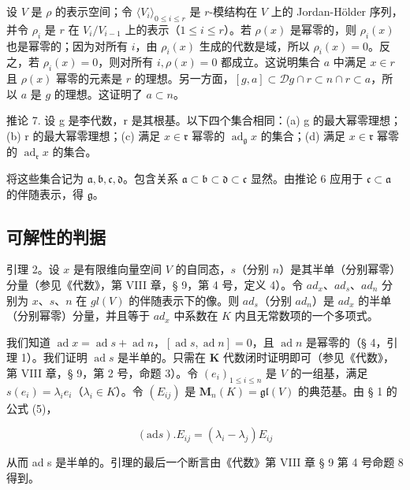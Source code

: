 设 \(V\) 是 \(\rho\) 的表示空间；令 \(\langle V_i \rangle_{0 \leqslant i \leqslant r}\) 是 \(r\)-模结构在 \(V\) 上的 Jordan-Hölder 序列，并令 \(\rho_i\) 是 \(r\) 在 \(V_i / V_{i-1}\) 上的表示（\(1 \leqslant i \leqslant r\)）。若 \(\rho(x)\) 是幂零的，则 \(\rho_i(x)\) 也是幂零的；因为对所有 \(i\)，由 \(\rho_i(x)\) 生成的代数是域，所以 \(\rho_i(x) = 0\)。反之，若 \(\rho_i(x) = 0\)，则对所有 \(i, \rho(x) = 0\) 都成立。这说明集合 \(a\) 中满足 \(x \in r\) 且 \(\rho(x)\) 幂零的元素是 \(r\) 的理想。另一方面，\([g, a] \subset \mathcal{D}g \cap r \subset n \cap r \subset a\)，所以 \(a\) 是 \(g\) 的理想。这证明了 \(a \subset n\)。

推论 7. 设 g 是李代数，r 是其根基。以下四个集合相同：(a) g 的最大幂零理想；(b) r 的最大幂零理想；(c) 满足 \(x \in \mathfrak{r}\) 幂零的 \(\operatorname{ad}_{\mathfrak{g}} x\) 的集合；(d) 满足 \(x \in \mathfrak{r}\) 幂零的 \(\operatorname{ad}_{\mathfrak{r}} x\) 的集合。

将这些集合记为 \(\mathfrak{a}, \mathfrak{b}, \mathfrak{c}, \mathfrak{d}\)。包含关系 \(\mathfrak{a} \subset \mathfrak{b} \subset \mathfrak{d} \subset \mathfrak{c}\) 显然。由推论 6 应用于 \(\mathfrak{c} \subset \mathfrak{a}\) 的伴随表示，得 \(\mathfrak{g}\)。

\subsection{可解性的判据}

引理 2。设 \(x\) 是有限维向量空间 \(V\) 的自同态，\(s\)（分别 \(n\)）是其半单（分别幂零）分量（参见《代数》，第 VIII 章，§ 9，第 4 号，定义 4）。令 \(ad_x\)、\(ad_s\)、\(ad_n\) 分别为 \(x\)、\(s\)、\(n\) 在 \(gl(V)\) 的伴随表示下的像。则 \(ad_s\)（分别 \(ad_n\)）是 \(ad_x\) 的半单（分别幂零）分量，并且等于 \(ad_x\) 中系数在 \(K\) 内且无常数项的一个多项式。

我们知道 \(\operatorname{ad} x = \operatorname{ad} s + \operatorname{ad} n\)，\([\operatorname{ad} s, \operatorname{ad} n] = 0\)，且 \(\operatorname{ad} n\) 是幂零的（§ 4，引理 1）。我们证明 \(\operatorname{ad} s\) 是半单的。只需在 \(\mathbf{K}\) 代数闭时证明即可（参见《代数》，第 VIII 章，§ 9，第 2 号，命题 3）。令 \((e_i)_{1 \leq i \leq n}\) 是 \(V\) 的一组基，满足 \(s(e_i) = \lambda_i e_i\)（\(\lambda_i \in K\)）。令 \((E_{ij})\) 是 \(\mathbf{M}_n(K) = \mathfrak{gl}(V)\) 的典范基。由 § 1 的公式 (5)，

\[
(\mathrm{ad} s). E _ {i j} = (\lambda_ {i} - \lambda_ {j}) E _ {i j}
\]

从而 ad s 是半单的。引理的最后一个断言由《代数》第 VIII 章 § 9 第 4 号命题 8 得到。

